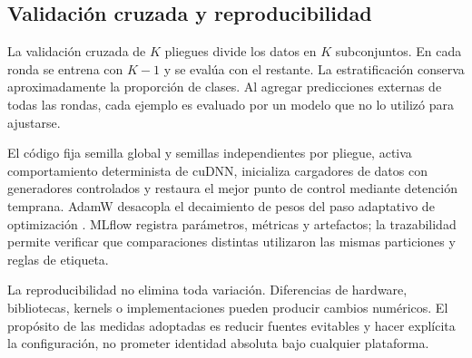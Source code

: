 \subsection{Validación cruzada y reproducibilidad}

La validación cruzada de $K$ pliegues divide los datos en $K$ subconjuntos. En cada ronda se entrena con $K-1$ y se evalúa con el restante. La estratificación conserva aproximadamente la proporción de clases. Al agregar predicciones externas de todas las rondas, cada ejemplo es evaluado por un modelo que no lo utilizó para ajustarse.

El código fija semilla global y semillas independientes por pliegue, activa comportamiento determinista de cuDNN, inicializa cargadores de datos con generadores controlados y restaura el mejor punto de control mediante detención temprana. AdamW desacopla el decaimiento de pesos del paso adaptativo de optimización \parencite{loshchilov2019adamw}. MLflow registra parámetros, métricas y artefactos; la trazabilidad permite verificar que comparaciones distintas utilizaron las mismas particiones y reglas de etiqueta.

La reproducibilidad no elimina toda variación. Diferencias de hardware, bibliotecas, kernels o implementaciones pueden producir cambios numéricos. El propósito de las medidas adoptadas es reducir fuentes evitables y hacer explícita la configuración, no prometer identidad absoluta bajo cualquier plataforma.
